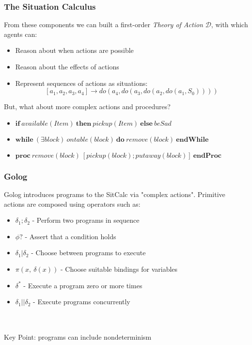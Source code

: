 \documentclass{beamer}
\newcommand{\Dt}{\mathcal{D}}
\begin{document}
\begin{frame}
\frametitle{The Situation Calculus}
From these components we can built a first-order \emph{Theory of Action}
$\Dt$, with which agents can:
\begin{itemize}
  \item Reason about when actions are possible
  \item Reason about the effects of actions
  \item Represent sequences of actions as situations:\[
\left[a_1, a_2, a_3, a_4\right] \rightarrow do(a_4,do(a_3,do(a_2,do(a_1,S_0))))
\]
\end{itemize}
\pause
But, what about more complex actions and procedures?
\begin{itemize}
  \item $\mathbf{if}\ available(Item)\ \mathbf{then}\ pickup(Item)\ \mathbf{else}\ beSad$
  \item $\mathbf{while}\ (\exists block)\ ontable(block)\ \mathbf{do}\ remove(block)\ \mathbf{endWhile}$
  \item $\mathbf{proc}\ remove(block)\ [pickup(block);putaway(block)]\ \mathbf{endProc}$
\end{itemize}
\end{frame}

\begin{frame}
\frametitle{Golog}
Golog introduces programs to the SitCalc via "complex actions".
Primitive actions are composed using operators such as:

\begin{itemize}
  \item $\delta_1;\delta_2$ - Perform two programs in sequence
  \item $\phi?$ - Assert that a condition holds
  \item $\delta_1|\delta_2$ - Choose between programs to execute
  \item $\pi(x,\ \delta(x))$ - Choose suitable bindings for variables
  \item $\delta^*$ - Execute a program zero or more times
  \item $\delta_1 || \delta_2$ - Execute programs concurrently
\end{itemize}
\ \\
\ \\
\pause
Key Point:  programs can include \alert{nondeterminism}
\end{frame}
\end{document}
